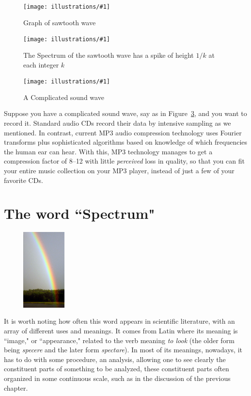 \documentclass[openany]{book}
\newcommand{\ill}[3]{%
   \begin{figure}[H]%
   \vspace{-2ex}
   \centering%
   \texttt{[image: illustrations/\#1]}%
   \caption{#3}%
   \vspace{-2ex}
    \end{figure}}
\theoremstyle{plain}
\theoremstyle{definition}
\begin{document}
{   \ill{sawtooth}{.7}{Graph of sawtooth wave\label{fig:sawtooth}}
   \ill{sawtooth-spectrum}{.7}{The Spectrum of the sawtooth wave has a spike of height $1/k$ at
each integer $k$\label{fig:sawtooth-spectrum}}



 \ill{complicated-wave}{.7}{A Complicated sound wave\label{fig:complicated-wave}}

Suppose you have a complicated sound wave, say as in
Figure~\ref{fig:complicated-wave}, and you want to record it.
Standard audio CDs record their data by intensive sampling as we
mentioned. In contrast, current MP3 audio compression technology uses
Fourier transforms plus sophisticated algorithms based on
knowledge of which frequencies the human ear can hear.
With this, MP3 technology manages to
get a compression factor of 8--12 with little {\em perceived} loss in
quality, so that you can fit your entire music collection on your
MP3 player, instead of just a few of your favorite CDs.

\chapter{The word ``Spectrum"}

\begin{figure}
    \includegraphics[width=0.2\textwidth]{illustrations/rainbow}
\end{figure}

  It is worth noting how often this word appears in scientific literature, with an array of different uses and meanings.   It  comes from Latin where its meaning is ``image," or ``appearance," related to the verb meaning {\it to look} (the older form being  {\it specere} and the later form {\it spectare}).  In most of its meanings, nowadays, it has to do with some procedure, an analysis, allowing one to see clearly the  constituent parts of something to be analyzed, these constituent parts often organized in some continuous scale, such as in the discussion of the previous chapter.

}
\end{document}
